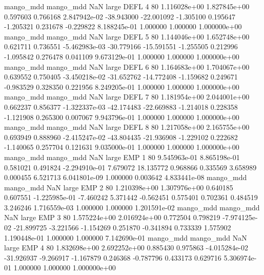 mango_mdd mango_mdd                   NaN      large     DEFL                 4 80 1.116028e+00   1.827845e+00      0.597603       0.766168  2.847942e-02    -38.943000    -22.001092    -1.305100       0.195647 -1.205321   0.231678    -0.229822   8.188245e-01            1.000000        1.000000        1.000000e+00
mango_mdd mango_mdd                   NaN      large     DEFL                 5 80 1.144046e+00   1.652748e+00      0.621711       0.736551 -5.462983e-03    -30.779166    -15.591551    -1.255505       0.212996 -1.095842   0.276478     0.041109   9.673129e-01            1.000000        1.000000        1.000000e+00
mango_mdd mango_mdd                   NaN      large     DEFL                 6 80 1.164683e+00   1.704067e+00      0.639552       0.750405 -3.450218e-02    -31.652762    -14.772408    -1.159682       0.249671 -0.983529   0.328350     0.221956   8.249205e-01            1.000000        1.000000        1.000000e+00
mango_mdd mango_mdd                   NaN      large     DEFL                 7 80 1.181954e+00   2.044001e+00      0.662237       0.856377 -1.322337e-03    -42.174483    -22.669883    -1.214018       0.228358 -1.121908   0.265300     0.007067   9.943796e-01            1.000000        1.000000        1.000000e+00
mango_mdd mango_mdd                   NaN      large     DEFL                 8 80 1.217058e+00   2.165755e+00      0.693949       0.888960 -2.415247e-02    -43.804435    -21.936908    -1.229102       0.222682 -1.140065   0.257704     0.121631   9.035000e-01            1.000000        1.000000        1.000000e+00
mango_mdd mango_mdd                   NaN      large      EMP                 1 80 9.545963e-01   8.865198e-01      0.581021       0.491824 -2.294910e-01      7.679072     18.135772     0.968866       0.335569  3.658989   0.000455     6.521713   6.041801e-09            1.000000        0.003642        4.833441e-08
mango_mdd mango_mdd                   NaN      large      EMP                 2 80 1.210398e+00   1.307976e+00      0.640185       0.607551 -1.225985e-01     -7.460242      5.371442    -0.562451       0.575401  0.702361   0.484519     3.246246   1.716559e-03            1.000000        1.000000        1.201591e-02
mango_mdd mango_mdd                   NaN      large      EMP                 3 80 1.575224e+00   2.016924e+00      0.772504       0.798219 -7.974125e-02    -21.899725     -3.221566    -1.154269       0.251870 -0.341894   0.733339     1.575902   1.190448e-01            1.000000        1.000000        7.142690e-01
mango_mdd mango_mdd                   NaN      large      EMP                 4 80 1.832698e+00   2.692252e+00      0.885430       0.975863 -4.015284e-02    -31.926937     -9.266917    -1.167879       0.246368 -0.787796   0.433173     0.629716   5.306974e-01            1.000000        1.000000        1.000000e+00
